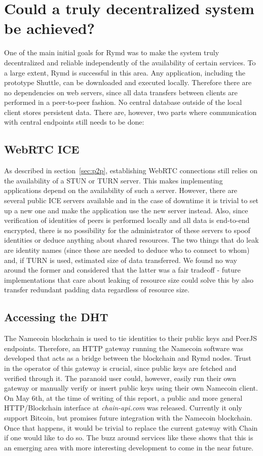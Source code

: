 \section{Could a truly decentralized system be achieved?}
One of the main initial goals for Rymd was to make the system truly decentralized and reliable independently of the availability of certain services. To a large extent, Rymd is successful in this area. Any application, including the prototype Shuttle, can be downloaded and executed locally. Therefore there are no dependencies on web servers, since all data transfers between clients are performed in a peer-to-peer fashion. No central database outside of the local client stores persistent data. There are, however, two parts where communication with central endpoints still needs to be done:

\subsection{WebRTC ICE}
As described in section~\ref{sec:p2p}, establishing WebRTC connections still relies on the availability of a STUN or TURN server. This makes implementing applications depend on the availability of such a server. However, there are several public ICE servers available and in the case of downtime it is trivial to set up a new one and make the application use the new server instead. Also, since verification of identities of peers is performed locally and all data is end-to-end encrypted, there is no possibility for the administrator of these servers to spoof identities or deduce anything about shared resources. The two things that do leak are identity names (since these are needed to deduce who to connect to whom) and, if TURN is used, estimated size of data transferred. We found no way around the former and considered that the latter was a fair tradeoff - future implementations that care about leaking of resource size could solve this by also transfer redundant padding data regardless of resource size.

\subsection{Accessing the DHT}
The Namecoin blockchain is used to tie identities to their public keys and PeerJS endpoints. Therefore, an HTTP gateway running the Namecoin software was developed that acts as a bridge between the blockchain and Rymd nodes. Trust in the operator of this gateway is crucial, since public keys are fetched and verified through it. The paranoid user could, however, easily run their own gateway or manually verify or insert public keys using their own Namecoin client. On May 6th, at the time of writing of this report, a public and more general HTTP/Blockchain interface at \emph{chain-api.com}\cite{Chain:2014:Online} was released. Currently it only support Bitcoin, but promises future integration with the Namecoin blockchain. Once that happens, it would be trivial to replace the current gateway with Chain if one would like to do so. The buzz around services like these shows that this is an emerging area with more interesting development to come in the near future.

